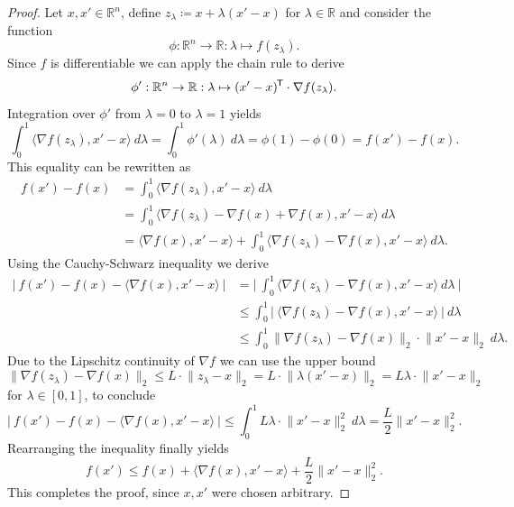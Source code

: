 \documentclass[11pt, a4paper]{article}
\newcommand{\R}{\mathbb{R}}
\newcommand*{\tr}{^{\mkern-1.5mu\mathsf{T}}}
\begin{document}
\begin{proof}
Let $x,x' \in \R^n$, define $z_{\lambda} \coloneq x + \lambda (x' - x)$ for $\lambda \in \R$ and consider the function
\[ \phi : \R^n \to \R : \lambda \mapsto f(z_{\lambda}). \]
Since $f$ is differentiable we can apply the chain rule to derive
\[ \phi' : \R^n \to \R : \lambda \mapsto (x'-x)\tr \cdot \nabla f(z_\lambda) . \]
Integration over $\phi'$ from $\lambda = 0$ to $\lambda = 1$ yields
\[ \int_{0}^{1} \big \langle \nabla f(z_{\lambda}), x'-x \big \rangle \ d\lambda = \int_{0}^{1} \phi'(\lambda) \ d \lambda = \phi(1) - \phi(0) = f(x') - f(x). \]
This equality can be rewritten as
\[ \begin{split} 
f(x') - f(x) 
&= \int_{0}^{1}\big \langle \nabla f(z_{\lambda}), x'-x \big \rangle \ d\lambda \\\
&= \int_{0}^{1} \big \langle \nabla f(z_{\lambda}) - \nabla f(x) + \nabla f(x) , x'-x\big \rangle \ d\lambda \\\
&= \big \langle \nabla f(x), x'-x \big \rangle + \int_{0}^{1} \big \langle \nabla f(z_{\lambda}) - \nabla f(x), x'-x \big \rangle \ d\lambda.
\end{split} \]
Using the Cauchy-Schwarz inequality we derive
\[ \begin{split}
\Big | \ f(x') - f(x) - \big \langle \nabla f(x), x'-x \big \rangle \ \Big | 
&= \Big | \ \int_{0}^{1} \big \langle \nabla f(z_{\lambda}) - \nabla f(x), x'-x \big \rangle \ d\lambda \ \Big | \\\
&\leq \int_{0}^{1} \Big | \ \big \langle \nabla f(z_{\lambda}) - \nabla f(x), x'-x \big \rangle \ \Big | \ d\lambda \\\
&\leq \int_{0}^{1} \big \| \nabla f( z_{\lambda}) - \nabla f(x) \big \|_2 \cdot \big \| x'-x \big \|_2 \ d\lambda.
\end{split} \]
Due to the Lipschitz continuity of $\nabla f$ we can use the upper bound 
\[ \big \| \nabla f( z_{\lambda}) - \nabla f(x) \big \|_2 \leq L \cdot \big \| z_{\lambda} - x \big \|_2 = L \cdot \big \| \lambda(x'-x) \big \|_2 = L\lambda \cdot \big \| x'-x \big \|_2 \]
for $\lambda \in [0,1]$, to conclude
\[ \Big | \ f(x') - f(x) - \big \langle \nabla f(x), x'-x \big \rangle \ \Big | \leq \int_{0}^{1} L\lambda \cdot \big \| x'-x \big \|_2^2 \ d\lambda = \frac{L}{2} \big \| x'-x \big \|_2^2. \]
Rearranging the inequality finally yields
\[ f(x') \leq f(x) + \big \langle \nabla f(x) , x' -x \big \rangle + \frac{L}{2} \big \| x' - x \big \|_2^2. \]
This completes the proof, since $x,x'$ were chosen arbitrary.
\end{proof}
\end{document}
